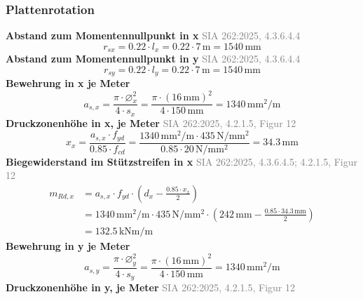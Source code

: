 \documentclass[11pt,a4paper]{article}
\newcommand{\normref}[1]{{\small\textcolor{gray}{#1}}}
\begin{document}
\subsubsection{Plattenrotation}
\noindent\textbf{Abstand zum Momentennullpunkt in x} \hfill \normref{SIA 262:2025, 4.3.6.4.4}
\begin{equation*}
r_{sx} = 0.22 \cdot l_x = 0.22 \cdot 7\,\mathrm{m} = 1540\,\mathrm{mm}
\end{equation*}
\noindent\textbf{Abstand zum Momentennullpunkt in y} \hfill \normref{SIA 262:2025, 4.3.6.4.4}
\begin{equation*}
r_{sy} = 0.22 \cdot l_y = 0.22 \cdot 7\,\mathrm{m} = 1540\,\mathrm{mm}
\end{equation*}
\noindent\textbf{Bewehrung in x je Meter}
\begin{equation*}
a_{s,x} = \frac{\pi \cdot \varnothing_x^{2}}{4 \cdot s_x} = \frac{\pi \cdot \left(16\,\mathrm{mm}\right)^{2}}{4 \cdot 150\,\mathrm{mm}} = 1340\,\mathrm{mm}^{2}/\mathrm{m}
\end{equation*}
\noindent\textbf{Druckzonenhöhe in x, je Meter} \hfill \normref{SIA 262:2025, 4.2.1.5, Figur 12}
\begin{equation*}
x_x = \frac{a_{s,x} \cdot f_{yd}}{0.85 \cdot f_{cd}} = \frac{1340\,\mathrm{mm}^{2}/\mathrm{m} \cdot 435\,\mathrm{N}/\mathrm{mm}^{2}}{0.85 \cdot 20\,\mathrm{N}/\mathrm{mm}^{2}} = 34.3\,\mathrm{mm}
\end{equation*}
\noindent\textbf{Biegewiderstand im Stützstreifen in x} \hfill \normref{SIA 262:2025, 4.3.6.4.5; 4.2.1.5, Figur 12}
\begin{equation*}
\begin{aligned}
  m_{Rd,x} &= a_{s,x} \cdot f_{yd} \cdot \left(d_x - \frac{0.85 \cdot x_x}{2}\right) \\
  &= 1340\,\mathrm{mm}^{2}/\mathrm{m} \cdot 435\,\mathrm{N}/\mathrm{mm}^{2} \cdot \left(242\,\mathrm{mm} - \frac{0.85 \cdot 34.3\,\mathrm{mm}}{2}\right) \\
  &= 132.5\,\mathrm{kNm}/\mathrm{m}
\end{aligned}
\end{equation*}
\noindent\textbf{Bewehrung in y je Meter}
\begin{equation*}
a_{s,y} = \frac{\pi \cdot \varnothing_y^{2}}{4 \cdot s_y} = \frac{\pi \cdot \left(16\,\mathrm{mm}\right)^{2}}{4 \cdot 150\,\mathrm{mm}} = 1340\,\mathrm{mm}^{2}/\mathrm{m}
\end{equation*}
\noindent\textbf{Druckzonenhöhe in y, je Meter} \hfill \normref{SIA 262:2025, 4.2.1.5, Figur 12}
\end{document}

